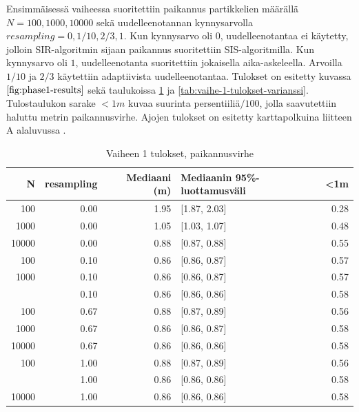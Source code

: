 \documentclass[
  12pt,
  a4paper, twoside]{book}
\begin{document}
Ensimmäisessä vaiheessa suoritettiin paikannus partikkelien määrällä \(N={100,1000,10000}\) sekä uudelleenotannan kynnysarvolla \(resampling={0,1/10,2/3,1}\). Kun kynnysarvo oli \(0\), uudelleenotantaa ei käytetty, jolloin SIR-algoritmin sijaan paikannus suoritettiin SIS-algoritmilla. Kun kynnysarvo oli \(1\), uudelleenotanta suoritettiin jokaisella aika-askeleella. Arvoilla \(1/10\) ja \(2/3\) käytettiin adaptiivista uudelleenotantaa. Tulokset on esitetty kuvassa \(\ref{fig:phase1-results}\) sekä taulukoissa \ref{tab:vaihe-1-tulokset} ja \ref{tab:vaihe-1-tulokset-varianssi}. Tulostaulukon sarake \(<1m\) kuvaa suurinta persentiiliä\(/100\), jolla saavutettiin haluttu metrin paikannusvirhe. Ajojen tulokset on esitetty karttapolkuina liitteen A alaluvussa .

\begin{table}

\caption{\label{tab:vaihe-1-tulokset}Vaiheen 1 tulokset, paikannusvirhe}
\centering
\begin{tabular}[t]{rrrlr}
\toprule
N & resampling & Mediaani (m) & Mediaanin 95\%-luottamusväli & <1m\\
\midrule
100 & 0.00 & 1.95 & {}[1.87, 2.03] & 0.28\\
1000 & 0.00 & 1.05 & {}[1.03, 1.07] & 0.48\\
10000 & 0.00 & 0.88 & {}[0.87, 0.88] & 0.55\\
100 & 0.10 & 0.86 & {}[0.86, 0.87] & 0.57\\
1000 & 0.10 & 0.86 & {}[0.86, 0.87] & 0.57\\
\addlinespace
10000 & 0.10 & 0.86 & {}[0.86, 0.86] & 0.58\\
100 & 0.67 & 0.88 & {}[0.87, 0.89] & 0.56\\
1000 & 0.67 & 0.86 & {}[0.86, 0.87] & 0.58\\
10000 & 0.67 & 0.86 & {}[0.86, 0.86] & 0.58\\
100 & 1.00 & 0.88 & {}[0.87, 0.89] & 0.56\\
\addlinespace
1000 & 1.00 & 0.86 & {}[0.86, 0.86] & 0.58\\
10000 & 1.00 & 0.86 & {}[0.86, 0.86] & 0.58\\
\bottomrule
\end{tabular}
\end{table}
\end{document}
